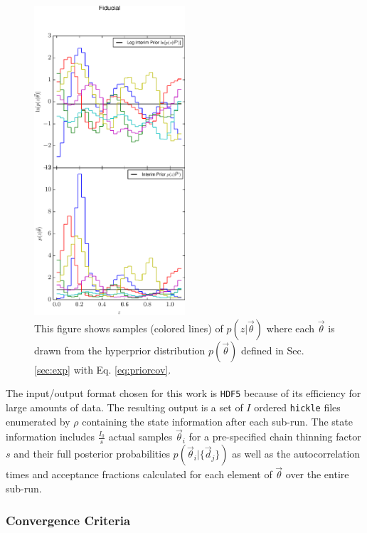 \documentclass[preprint]{aastex}
\begin{document}
\begin{figure}
\includegraphics[width=0.5\textwidth]{figs/null/priorsamps.pdf}
\caption{This figure shows samples (colored lines) of $p(z|\vec{\theta})$ where 
each $\vec{\theta}$ is drawn from the hyperprior distribution $p(\vec{\theta})$ 
defined in Sec. \ref{sec:exp} with Eq. \ref{eq:priorcov}.}
\label{fig:prior}
\end{figure}

The input/output format chosen for this work is \texttt{HDF5} because of its 
efficiency for large amounts of data.  The resulting output is a set of $I$ 
ordered \texttt{hickle} files enumerated by $\rho$ containing the state 
information after each sub-run.  The state information includes 
$\frac{I_{0}}{s}$ actual samples $\vec{\theta}_{i}$ for a pre-specified chain 
thinning factor $s$ and their full posterior probabilities 
$p(\vec{\theta}_{i}|\{\vec{d}_{j}\})$ as well as the autocorrelation times and 
acceptance fractions calculated for each element of $\vec{\theta}$ over the 
entire sub-run.  

\subsubsection{Convergence Criteria}
\label{sec:acorr}
\end{document}
